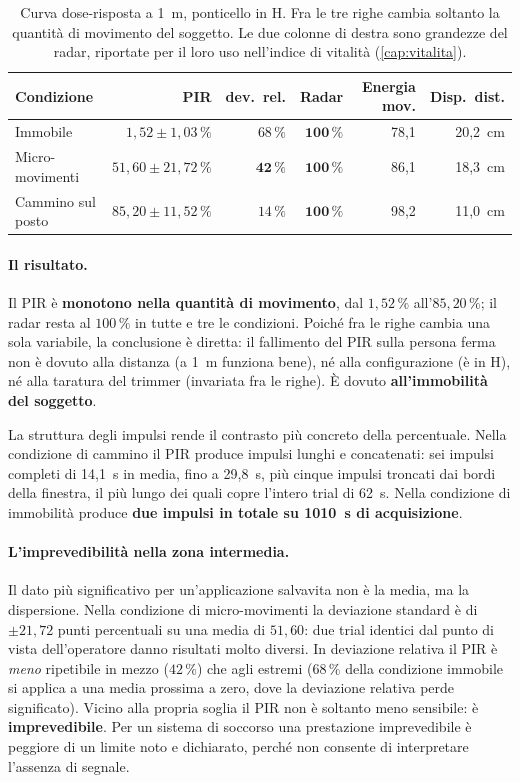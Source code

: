 \begin{table}[htbp]
\centering
\caption{Curva dose-risposta a 1~m, ponticello in H. Fra le tre righe cambia soltanto
la quantità di movimento del soggetto. Le due colonne di destra sono grandezze del
radar, riportate per il loro uso nell'indice di vitalità (\cref{cap:vitalita}).}
\label{tab:dose-risposta}
\small
\begin{tabular}{@{}lrrrrr@{}}
\toprule
\textbf{Condizione} & \textbf{PIR} & \textbf{dev.\ rel.} & \textbf{Radar} &
\textbf{Energia mov.} & \textbf{Disp.\ dist.} \\
\midrule
Immobile          & $1{,}52 \pm 1{,}03\,\%$   & $68\,\%$ & $\mathbf{100\,\%}$ & 78,1 & 20,2~cm \\
Micro-movimenti   & $51{,}60 \pm 21{,}72\,\%$ & $\mathbf{42\,\%}$ & $\mathbf{100\,\%}$ & 86,1 & 18,3~cm \\
Cammino sul posto & $85{,}20 \pm 11{,}52\,\%$ & $14\,\%$ & $\mathbf{100\,\%}$ & 98,2 & 11,0~cm \\
\bottomrule
\end{tabular}
\end{table}

\paragraph{Il risultato.} Il PIR è \textbf{monotono nella quantità di movimento}, dal
$1{,}52\,\%$ all'$85{,}20\,\%$; il radar resta al $100\,\%$ in tutte e tre le
condizioni. Poiché fra le righe cambia una sola variabile, la conclusione è diretta:
il fallimento del PIR sulla persona ferma non è dovuto alla distanza (a 1~m funziona
bene), né alla configurazione (è in H), né alla taratura del trimmer (invariata fra le
righe). È dovuto \textbf{all'immobilità del soggetto}.

La struttura degli impulsi rende il contrasto più concreto della percentuale. Nella
condizione di cammino il PIR produce impulsi lunghi e concatenati: sei impulsi
completi di 14,1~s in media, fino a 29,8~s, più cinque impulsi troncati dai bordi
della finestra, il più lungo dei quali copre l'intero trial di 62~s. Nella condizione
di immobilità produce \textbf{due impulsi in totale su 1010~s di acquisizione}.

\paragraph{L'imprevedibilità nella zona intermedia.} Il dato più significativo per
un'applicazione salvavita non è la media, ma la dispersione. Nella condizione di
micro-movimenti la deviazione standard è di $\pm 21{,}72$ punti percentuali su una
media di $51{,}60$: due trial identici dal punto di vista dell'operatore danno
risultati molto diversi. In deviazione relativa il PIR è \emph{meno} ripetibile in
mezzo ($42\,\%$) che agli estremi ($68\,\%$ della condizione immobile si applica a una
media prossima a zero, dove la deviazione relativa perde significato). Vicino alla
propria soglia il PIR non è soltanto meno sensibile: è \textbf{imprevedibile}. Per un
sistema di soccorso una prestazione imprevedibile è peggiore di un limite noto e
dichiarato, perché non consente di interpretare l'assenza di segnale.

